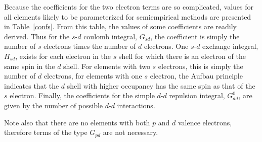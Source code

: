 Because the coefficients for the two electron terms are so complicated,  values
for all elements likely to be parameterized for semiempirical  methods are
presented in Table~\ref{confs}.  From this table, the values of some 
coefficients are readily derived.  Thus for the $s$-$d$ coulomb integral,
$G_{sd}$, the coefficient is simply the number of $s$ electrons times the
number of $d$ electrons.  One $s$-$d$ exchange integral, $H_{sd}$, exists for 
each electron in the $s$ shell for which there is an electron of the  same spin
in the $d$ shell.  For elements with two $s$ electrons, this is simply the
number of $d$ electrons, for elements with one $s$ electron, the Aufbau
principle indicates that the $d$ shell with higher occupancy has the same spin
as that of the $s$ electron.  Finally, the coefficients for the  simple $d$-$d$
repulsion integral, $G_{dd}^0$, are given by the number of possible $d$-$d$
interactions.

Note also that there are no elements with both $p$ and $d$ valence electrons,
therefore terms of the type $G_{pd}$ are not necessary.

